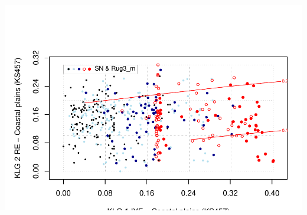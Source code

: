 \documentclass[]{article}
\begin{document}
\includegraphics{Landscape_analysis_example_4_files/figure-latex/unnamed-chunk-47-1.pdf}
\end{document}
